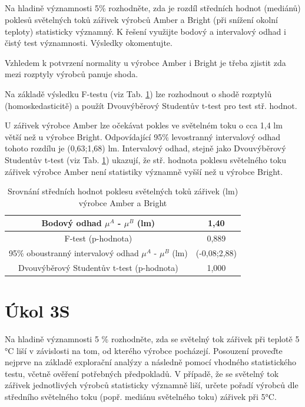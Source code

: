\documentclass[czech]{article}%
\begin{document}
\newpage
\subsection{}
Na hladině významnosti 5\% rozhodněte, zda je rozdíl středních hodnot (mediánů) 
poklesů světelných toků zářivek výrobců Amber a Bright (při snížení okolní teploty) statisticky významný.
K řešení využijte bodový a intervalový odhad i čistý test významnosti. Výsledky okomentujte.

Vzhledem k potvrzení normality u výrobce Amber i Bright je třeba zjistit zda mezi rozptyly výrobců panuje shoda.

Na základě výsledku F-testu (viz Tab. \ref{tab:dvouvyberTest}) lze rozhodnout o shodě rozptylů (homoskedasticitě) a použít 
Dvouvýběrový Studentův t-test pro test stř. hodnot.

U zářivek výrobce Amber lze očekávat pokles ve světelném toku o cca 1,4 lm větší než u výrobce Bright. 
Odpovídající 95\% levostranný intervalový odhad tohoto rozdílu je (0,63;1,68) lm.
Intervalový odhad, stejně jako Dvouvýběrový Studentův t-test (viz Tab. \ref{tab:dvouvyberTest}) ukazují, že stř. hodnota 
poklesu světelného toku zářivek výrobce Amber není statistiky významně vyšší než u výrobce Bright.

\begin{table}[H]
	\centering
	\caption{Srovnání středních hodnot poklesu světelných toků zářivek (lm) výrobce Amber a Bright}
	\label{tab:dvouvyberTest}
    \begin{tabular}{c|c}
        Bodový odhad $\mu^A$ - $\mu^B$ (lm)                                   & 1,40        \\
        \hline
        F-test (p-hodnota)                                                    & 0,889        \\
        \hline
        95\% oboustranný intervalový odhad $\mu^A$ - $\mu^B$ (lm)             & (-0,08;2,88)  \\
        \hline
        Dvouvýběrový Studentův t-test (p-hodnota)                             & 1,000         \\
    \end{tabular}
\end{table}

\newpage
\section{Úkol 3S}
Na hladině významnosti 5 \% rozhodněte, zda se světelný tok zářivek při teplotě 5 °C liší 
v závislosti na tom, od kterého výrobce pocházejí. 
Posouzení proveďte nejprve na základě explorační analýzy a následně pomocí 
vhodného statistického testu, včetně ověření potřebných předpokladů. 
V případě, že se světelný tok zářivek jednotlivých výrobců statisticky významně liší, 
určete pořadí výrobců dle středního světelného toku (popř. mediánu světelného toku) zářivek při 5°C.
\end{document}
